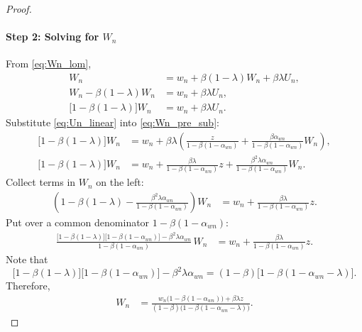 \documentclass[preprint,12pt]{elsarticle}
\begin{document}
\begin{proof}
\paragraph{Step 2: Solving for \(W_n\)}
From \eqref{eq:Wn_lom},
\begin{align}
W_n &= w_n + \beta(1-\lambda)W_n + \beta\lambda U_n,\\
W_n - \beta(1-\lambda)W_n &= w_n + \beta\lambda U_n,\\
\big[1-\beta(1-\lambda)\big]W_n &= w_n + \beta\lambda U_n. \label{eq:Wn_pre_sub}
\end{align}
Substitute \eqref{eq:Un_linear} into \eqref{eq:Wn_pre_sub}:
\begin{align}
\big[1-\beta(1-\lambda)\big]W_n
&= w_n + \beta\lambda\left(
\frac{z}{1-\beta(1-\alpha_{wn})}
+ \frac{\beta\alpha_{wn}}{1-\beta(1-\alpha_{wn})}W_n
\right),\\
\big[1-\beta(1-\lambda)\big]W_n
&= w_n + \frac{\beta\lambda}{1-\beta(1-\alpha_{wn})}z
+ \frac{\beta^2\lambda\alpha_{wn}}{1-\beta(1-\alpha_{wn})}W_n.
\end{align}
Collect terms in \(W_n\) on the left:
\begin{align}
\left(
1-\beta(1-\lambda) - \frac{\beta^2\lambda\alpha_{wn}}{1-\beta(1-\alpha_{wn})}
\right)W_n
&= w_n + \frac{\beta\lambda}{1-\beta(1-\alpha_{wn})}z.
\end{align}
Put over a common denominator \(1-\beta(1-\alpha_{wn})\):
\begin{align}
\frac{\big[1-\beta(1-\lambda)\big]\big[1-\beta(1-\alpha_{wn})\big]-\beta^2\lambda\alpha_{wn}}
{1-\beta(1-\alpha_{wn})}
\,W_n
&= w_n + \frac{\beta\lambda}{1-\beta(1-\alpha_{wn})}z.
\end{align}
Note that
\[
\big[1-\beta(1-\lambda)\big]\big[1-\beta(1-\alpha_{wn})\big]-\beta^2\lambda\alpha_{wn}
= (1-\beta)\big[1-\beta(1-\alpha_{wn}-\lambda)\big].
\]
Therefore,
\begin{align}
W_n
&= \frac{w_n\big(1-\beta(1-\alpha_{wn})\big) + \beta\lambda z}
{(1-\beta)\big(1-\beta(1-\alpha_{wn}-\lambda)\big)}.
\label{eq:Wn_in_terms_of_wn}
\end{align}


\end{proof}
\end{document}
